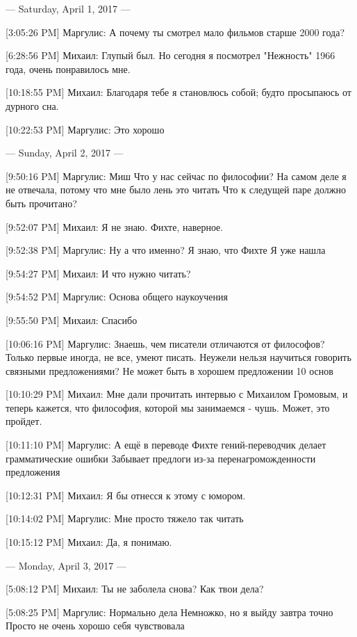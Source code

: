 \documentclass{article}
\begin{document}
\title{}
\author{}
\date{}
\maketitle


--- Saturday, April 1, 2017 ---

[3:05:26 PM] Маргулис:
А почему ты смотрел мало фильмов старше 2000 года?

[6:28:56 PM] Михаил:
Глупый был. Но сегодня я посмотрел "Нежность" 1966 года, очень понравилось мне.

[10:18:55 PM] Михаил:
Благодаря тебе я становлюсь собой; будто просыпаюсь от дурного сна.

[10:22:53 PM] Маргулис:
Это хорошо

--- Sunday, April 2, 2017 ---

[9:50:16 PM] Маргулис:
Миш
 Что у нас сейчас по философии?
 На самом деле я не отвечала, потому что мне было лень это читать
 Что к следущей паре должно быть прочитано?

[9:52:07 PM] Михаил:
Я не знаю.
 Фихте, наверное.

[9:52:38 PM] Маргулис:
Ну а что именно?
 Я знаю, что Фихте
 Я уже нашла

[9:54:27 PM] Михаил:
И что нужно читать?

[9:54:52 PM] Маргулис:
Основа общего наукоучения

[9:55:50 PM] Михаил:
Спасибо

[10:06:16 PM] Маргулис:
Знаешь, чем писатели отличаются от философов? Только первые иногда, не все, умеют писать. Неужели нельзя научиться говорить связными предложениями? Не может быть в хорошем предложении 10 основ

[10:10:29 PM] Михаил:
Мне дали прочитать интервью с Михаилом Громовым, и теперь кажется, что философия, которой мы занимаемся - чушь. Может, это пройдет.

[10:11:10 PM] Маргулис:
А ещё в переводе Фихте гений-переводчик делает грамматические ошибки
 Забывает предлоги из-за перенагроможденности предложения

[10:12:31 PM] Михаил:
Я бы отнесся к этому с юмором.

[10:14:02 PM] Маргулис:
Мне просто тяжело так читать

[10:15:12 PM] Михаил:
Да, я понимаю.

--- Monday, April 3, 2017 ---

[5:08:12 PM] Михаил:
Ты не заболела снова? Как твои дела?

[5:08:25 PM] Маргулис:
Нормально дела
 Немножко, но я выйду завтра точно
 Просто не очень хорошо себя чувствовала
\end{document}
